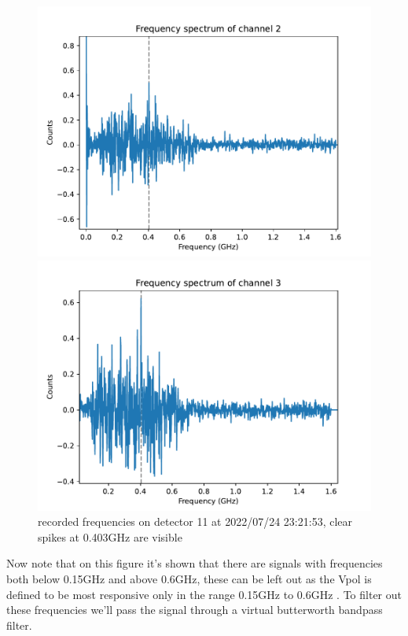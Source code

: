 \begin{figure}
	\begin{minipage}{0.49\textwidth}
		\includegraphics[width=\textwidth]{figures/2-freq.pdf}
	\end{minipage}
	\begin{minipage}{0.49\textwidth}
		\includegraphics[width=\textwidth]{figures/3-freq.pdf}
	\end{minipage}
	\caption{recorded frequencies on detector 11 at 2022/07/24 23:21:53, clear spikes at 0.403GHz are visible}
	\label{fig:freqs23}
\end{figure}
Now note that on this figure it's shown that there are signals with frequencies
both below 0.15GHz and above 0.6GHz, these can be left out as the Vpol is
defined to be most responsive only in the range 0.15GHz to 0.6GHz
\cite{Aguilar_2021}. To filter out these frequencies we'll pass the signal through a virtual
butterworth bandpass filter.

